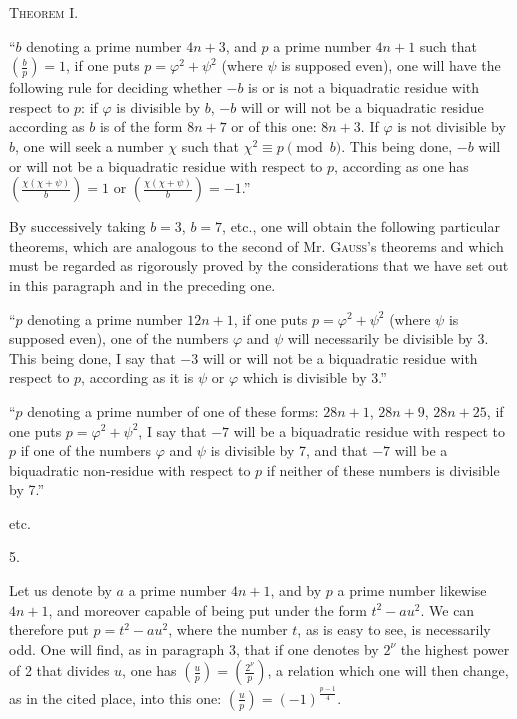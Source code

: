 \documentclass[11pt]{article}
\newcommand{\leg}[2]{\left(\frac{#1}{#2}\right)}
\newcommand{\unitid}[1]{\hypertarget{#1}{}}
\begin{document}
\begin{center}
\unitid{dirichlet.v1.p04b.en.thm.001}\textsc{Theorem I.}
\end{center}

\unitid{dirichlet.v1.p04b.en.par.015}“$b$ denoting a prime number $4n+3$, and $p$ a prime number $4n+1$ such that $\leg{b}{p}=1$, if one puts $p=\varphi^2+\psi^2$ (where $\psi$ is supposed even), one will have the following rule for deciding whether $-b$ is or is not a biquadratic residue with respect to $p$: if $\varphi$ is divisible by $b$, $-b$ will or will not be a biquadratic residue according as $b$ is of the form $8n+7$ or of this one: $8n+3$. If $\varphi$ is not divisible by $b$, one will seek a number $\chi$ such that $\chi^2\equiv p\pmod b$. This being done, $-b$ will or will not be a biquadratic residue with respect to $p$, according as one has $\leg{\chi(\chi+\psi)}{b}=1$ or $\leg{\chi(\chi+\psi)}{b}=-1$.”

\unitid{dirichlet.v1.p04b.en.par.016}By successively taking $b=3$, $b=7$, etc., one will obtain the following particular theorems, which are analogous to the second of Mr. \textsc{Gauss}'s theorems and which must be regarded as rigorously proved by the considerations that we have set out in this paragraph and in the preceding one.

\unitid{dirichlet.v1.p04b.en.par.017}“$p$ denoting a prime number $12n+1$, if one puts $p=\varphi^2+\psi^2$ (where $\psi$ is supposed even), one of the numbers $\varphi$ and $\psi$ will necessarily be divisible by 3. This being done, I say that $-3$ will or will not be a biquadratic residue with respect to $p$, according as it is $\psi$ or $\varphi$ which is divisible by 3.”

\unitid{dirichlet.v1.p04b.en.par.018}“$p$ denoting a prime number of one of these forms: $28n+1$, $28n+9$, $28n+25$, if one puts $p=\varphi^2+\psi^2$, I say that $-7$ will be a biquadratic residue with respect to $p$ if one of the numbers $\varphi$ and $\psi$ is divisible by 7, and that $-7$ will be a biquadratic non-residue with respect to $p$ if neither of these numbers is divisible by 7.”

\unitid{dirichlet.v1.p04b.en.par.019}etc.

\begin{center}
\unitid{dirichlet.v1.p04b.en.sec.005}5.
\end{center}

\unitid{dirichlet.v1.p04b.en.par.020}Let us denote by $a$ a prime number $4n+1$, and by $p$ a prime number likewise $4n+1$, and moreover capable of being put under the form $t^2-au^2$. We can therefore put $p=t^2-au^2$, where the number $t$, as is easy to see, is necessarily odd. One will find, as in paragraph 3, that if one denotes by $2^\nu$ the highest power of 2 that divides $u$, one has $\leg{u}{p}=\leg{2^\nu}{p}$, a relation which one will then change, as in the cited place, into this one: $\leg{u}{p}=(-1)^{\frac{p-1}{4}}$.
\end{document}

